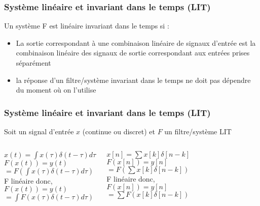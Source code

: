 \documentclass{beamer}
\begin{document}
\begin{frame}
\frametitle{Système linéaire et invariant dans le  temps (LIT) }

Un système F est linéaire invariant dans le temps si :
\begin{itemize}
\item La sortie correspondant à une combinaison linéaire de signaux d'entrée est la combinaison linéaire des signaux de sortie correspondant aux entrées prises séparément\\
\item la réponse d'un filtre/système invariant dans le temps ne doit pas dépendre du moment où on l'utilise\\
\end{itemize}

\end{frame} 

\begin{frame} 
\frametitle{Système linéaire et invariant dans le temps (LIT) }
Soit un signal d'entrée $x$ (continue ou discret) et $F$ un filtre/système LIT\\
\vspace{1 cm}
\begin{columns}
\column{70mm}
\begin{center}
$x(t) = \int x(\tau) \delta(t-\tau) d\tau$\\
\vspace{0.5cm}
$F(x(t)) = y(t)$\\
$ = F(\int x(\tau) \delta(t-\tau) d\tau)$\\
\vspace{0.5cm}
F linéaire donc, \\
\vspace{0.5cm}
$F(x(t)) = y(t) $\\
$= \int F (x(\tau) \delta(t-\tau) d\tau)$
\end{center}

\column{60mm}
\begin{center}
$x[n] = \sum x[k] \delta[n-k] $ \\
\vspace{0.5cm}
$F(x[n]) = y[n] $\\
$= F(\sum x[k] \delta[n-k]) $ \\
\vspace{0.5cm}
F linéaire donc, \\
\vspace{0.5cm}
$F(x[n]) = y[n] $\\
$ = \sum F( x[k] \delta[n-k]) $ \\


\end{center}
\end{columns}
\end{frame}
\end{document}
